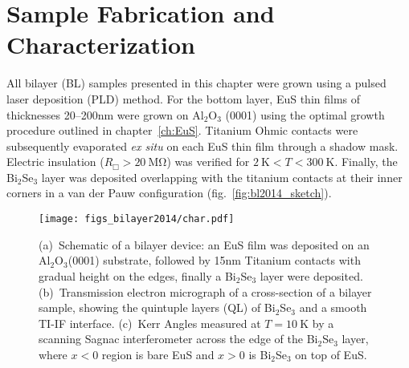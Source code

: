 \section{Sample Fabrication and Characterization}
All bilayer (BL) samples presented in this chapter were grown using a pulsed laser deposition (PLD) method. For the bottom layer, EuS thin films of thicknesses 20--200nm were grown on Al$_2$O$_3$ (0001) using the optimal growth procedure outlined in chapter~\ref{ch:EuS}. Titanium Ohmic contacts were subsequently evaporated {\it ex situ} on each EuS thin film through a shadow mask. Electric insulation ($R_\Box > 20~\mathrm{M\Omega}$) was verified for $2~\mathrm{K}<T<300~\mathrm{K}$. Finally, the Bi$_2$Se$_3$ layer was deposited overlapping with the titanium contacts at their inner corners in a van der Pauw configuration (fig.~\ref{fig:bl2014_sketch}).%
%
\begin{figure}[h]%
\centering%
\subfloat{\label{fig:bl2014_sketch}}%
\subfloat{\label{fig:bl2014_TEM}}%
\subfloat{\label{fig:bl2014_Sagnac}}%
\texttt{[image: figs\_bilayer2014/char.pdf]}%
\caption[Schematic and characterization of Bi$_2$Se$_3$ / EuS thin film bilayers]{\label{fig:bl2014_char}(a)~Schematic of a bilayer device: an EuS film was deposited on an Al$_2$O$_3$(0001) substrate, followed by 15nm Titanium contacts with gradual height on the edges, finally a Bi$_2$Se$_3$ layer were deposited. (b)~Transmission electron micrograph of a cross-section of a bilayer sample, showing the quintuple layers (QL) of Bi$_2$Se$_3$ and a smooth TI-IF interface. (c)~Kerr Angles measured at $T = 10~\mathrm{K}$ by a scanning Sagnac interferometer across the edge of the Bi$_2$Se$_3$ layer, where $x<0$ region is bare EuS and $x>0$ is Bi$_2$Se$_3$ on top of EuS.}%
\end{figure}%
